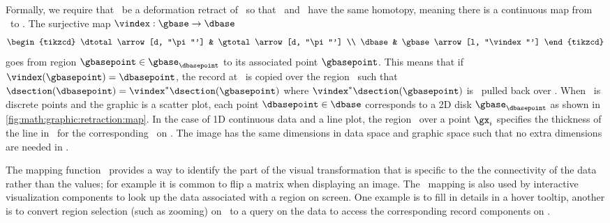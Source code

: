 \documentclass[../main.tex]{subfiles}
\begin{document}
Formally, we require that \dbase\ be a deformation retract\cite{RetractionTopology2020} of \gbase\ so that \dbase\ and \gbase\ have the same homotopy, meaning there is a continuous map from \gbase\ to \dbase\cite{weissteinHomotopy}. The surjective map $\vindex: \gbase \rightarrow \dbase$ 
\begin{equation}
    \begin{tikzcd}
        \dtotal \arrow[d, "\pi"'] & \gtotal \arrow[d, "\pi"'] \\
        \dbase                   & \gbase \arrow[l, "\vindex"']
    \end{tikzcd}
\end{equation}
goes from region $\gbasepoint \in \gbase_{\dbasepoint}$ to its associated point $\gbasepoint$. This means that if $\vindex(\gbasepoint) = \dbasepoint$, the record at \dbasepoint\ is copied over the region \gbasepoint\ such that $\dsection(\dbasepoint)=\vindex^*\dsection(\gbasepoint)$ where $\vindex^*\dsection(\gbasepoint)$  is \dsection\ pulled back over \gbase. When \dbase\ is discrete points and the graphic is a scatter plot, each point $\dbasepoint \in \dbase$ corresponds to a 2D disk $\gbase_{\dbasepoint}$ as shown in \autoref{fig:math:graphic:retraction:map}. In the case of 1D continuous data and a line plot, the region \gy\ over a point $\gx_i$ specifies the thickness of the line in \gbase\ for the corresponding \dsection\ on \dbasepoint. The image has the same dimensions in data space and graphic space such that no extra dimensions are needed in \gbase. 

The mapping function \vindex\ provides a way to identify the part of the visual transformation that is specific to the the connectivity of the data rather than the values; for example it is common to flip a matrix when displaying an image. The \vindex\ mapping is also used by interactive visualization components to look up the data associated with a region on screen.  One example is to fill in details in a hover tooltip, another is to convert region selection (such as zooming) on \gbase\ to a query on the data to access the corresponding record components on \dbase.
\end{document}
